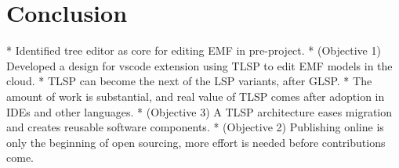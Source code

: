 \chapter{Conclusion}\label{chap:conclusion}


* Identified tree editor as core for editing EMF in pre-project.
* (Objective 1) Developed a design for vscode extension using TLSP to edit EMF models in the cloud.
* TLSP can become the next of the LSP variants, after GLSP.
* The amount of work is substantial, and real value of TLSP comes after adoption in IDEs and other languages.
* (Objective 3) A TLSP architecture eases migration and creates reusable software components.
* (Objective 2) Publishing online is only the beginning of open sourcing, more effort is needed before contributions come.
